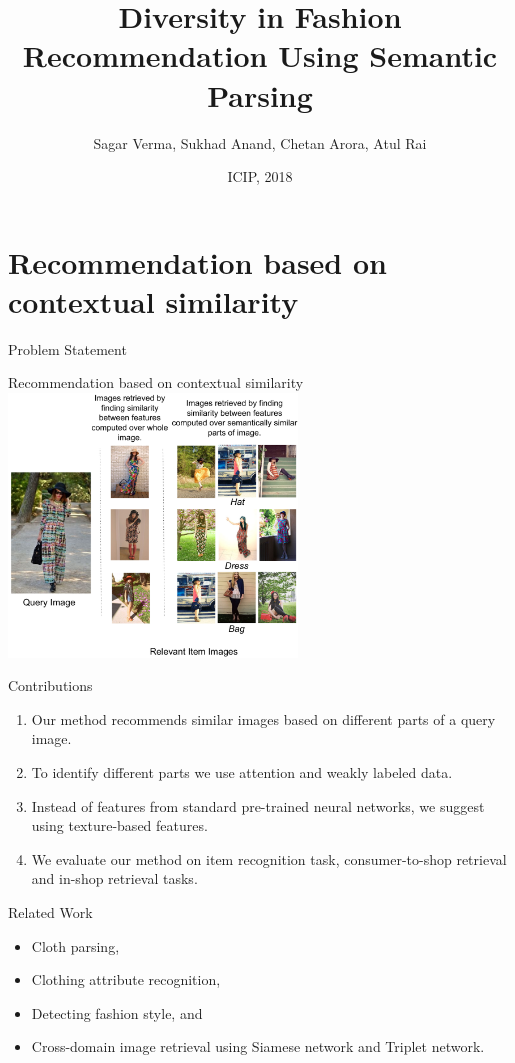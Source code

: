 \documentclass[handout]{beamer}
\title[ \insertdate]{Diversity in Fashion Recommendation Using Semantic Parsing}
\author{Sagar Verma\inst{1}, Sukhad Anand\inst{1}, Chetan Arora\inst{1}, Atul Rai\inst{2}}
\institute[IIIT Delhi and Staqu Technologies] %
{
  \inst{1}%
  Department of Computer Science and Engineering\\
  Indraprastha Institute of Information Technology, Delhi.
  \and
  \inst{2}%
  Staqu Technologies}
\date{ICIP, 2018}
\begin{document}
\begin{frame}
\titlepage
\end{frame}

\section{Recommendation based on contextual similarity}

\begin{frame}{Problem Statement}
\begin{center}
{\Large Recommendation based on contextual similarity}\\
\vspace{.5cm}
\includegraphics[width=0.8\linewidth, height=7cm]{images/teaser_staqu_texture}
\end{center}
\end{frame}


\begin{frame}{Contributions}
  \begin{enumerate}
    \item Our method recommends similar images based on different parts of a query image.

    \item To identify different parts we use attention and weakly labeled data.

    \item Instead of features from standard pre-trained neural networks, we suggest using texture-based features.

    \item We evaluate our method on item recognition task, consumer-to-shop retrieval and in-shop retrieval tasks.
  \end{enumerate}
\end{frame}

\begin{frame}{Related Work}
  \begin{itemize}
    \item Cloth parsing,
    \item Clothing attribute recognition,
    \item Detecting fashion style, and
    \item Cross-domain image retrieval using Siamese network and Triplet network.
  \end{itemize}
\end{frame}
\end{document}

